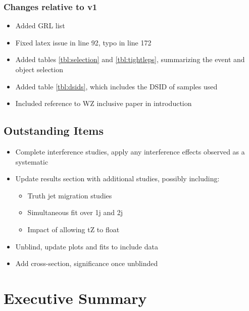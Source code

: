 \documentclass[NOTE, atlasdraft=true, texlive=2016, UKenglish]{\ATLASLATEXPATH atlasdoc}
\begin{document}
\subsubsection{Changes relative to v1}

\begin{itemize}
    \item Added GRL list
    \item Fixed latex issue in line 92, typo in line 172
    \item Added tables \ref{tbl:selection} and \ref{tbl:tightleps}, summarizing the event and object selection
    \item Added table \ref{tbl:dsids}, which includes the DSID of samples used
    \item Included reference to WZ inclusive paper in introduction
\end{itemize}

\subsection{Outstanding Items}

\begin{itemize}
    \item Complete interference studies, apply any interference effects observed as a systematic
    \item Update results section with additional studies, possibly including:
    \begin{itemize}
      \item Truth jet migration studies
      \item Simultaneous fit over 1j and 2j
      \item Impact of allowing tZ to float
    \end{itemize}
    \item Unblind, update plots and fits to include data
    \item Add cross-section, significance once unblinded
\end{itemize}



\clearpage

\section{Executive Summary}
\label{sec:summary}

\end{document}
